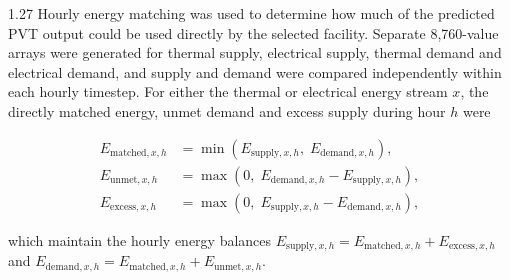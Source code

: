 \documentclass[12pt,letterpaper]{article}
\begin{document}
\begin{spacing}{1.27}
Hourly energy matching was used to determine how much of the predicted PVT output could be used directly by the selected facility. Separate 8,760-value arrays were generated for thermal supply, electrical supply, thermal demand and electrical demand, and supply and demand were compared independently within each hourly timestep. For either the thermal or electrical energy stream $x$, the directly matched energy, unmet demand and excess supply during hour $h$ were

\begin{align}
E_{\mathrm{matched},x,h} &= \min\left(E_{\mathrm{supply},x,h},\; E_{\mathrm{demand},x,h}\right), \label{eq:matched}\\
E_{\mathrm{unmet},x,h} &= \max\left(0,\; E_{\mathrm{demand},x,h}-E_{\mathrm{supply},x,h}\right), \label{eq:unmet}\\
E_{\mathrm{excess},x,h} &= \max\left(0,\; E_{\mathrm{supply},x,h}-E_{\mathrm{demand},x,h}\right), \label{eq:excess}
\end{align}

\noindent which maintain the hourly energy balances $E_{\mathrm{supply},x,h}=E_{\mathrm{matched},x,h}+E_{\mathrm{excess},x,h}$ and $E_{\mathrm{demand},x,h}=E_{\mathrm{matched},x,h}+E_{\mathrm{unmet},x,h}$.\par
\end{spacing}
\end{document}

